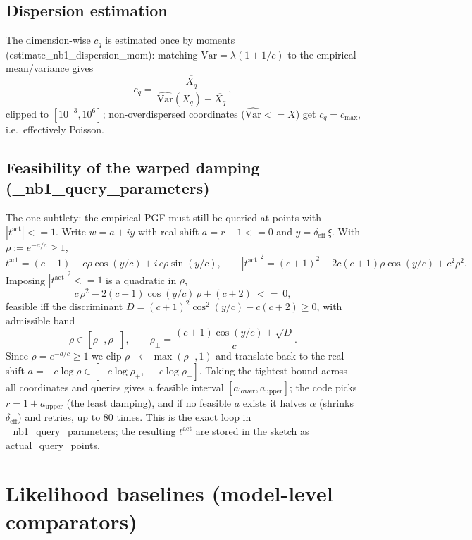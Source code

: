 \documentclass[11pt]{article}
\newcommand{\bt}{\bm{t}}
\newcommand{\deff}{\delta_{\mathrm{eff}}}
\newcommand{\code}[1]{\texttt{\small #1}}
\def\code#1{#1}%
\def\small{}%
\def\bm#1{#1}%
\def\bt{t}%
\def\le{<=}%
\theoremstyle{definition}
\begin{document}
\subsection{Dispersion estimation}
The dimension-wise $c_q$ is estimated once by moments (\code{estimate\_nb1\_dispersion\_mom}):
matching $\mathrm{Var}=\lambda(1+1/c)$ to the empirical mean/variance gives
\begin{equation}
c_q = \frac{\overline{X_q}}{\,\widehat{\mathrm{Var}}(X_q)-\overline{X_q}\,},
\end{equation}
clipped to $[10^{-3},10^{6}]$; non-overdispersed coordinates ($\widehat{\mathrm{Var}}\le\overline X$)
get $c_q=c_{\max}$, i.e.\ effectively Poisson.

\subsection{Feasibility of the warped damping (\code{\_nb1\_query\_parameters})}
The one subtlety: the empirical PGF must still be queried at points with
$|\bt^{\mathrm{act}}|\le1$. Write $w=a+iy$ with real shift $a=r-1\le0$ and
$y=\deff\,\xi$. With $\rho:=e^{-a/c}\ge1$,
\[
t^{\mathrm{act}} = (c+1)-c\rho\cos(y/c) + i\,c\rho\sin(y/c),
\qquad
|t^{\mathrm{act}}|^2 = (c+1)^2 - 2c(c+1)\rho\cos(y/c) + c^2\rho^2 .
\]
Imposing $|t^{\mathrm{act}}|^2\le1$ is a quadratic in $\rho$,
\begin{equation}
c\,\rho^2 - 2(c+1)\cos(y/c)\,\rho + (c+2)\ \le\ 0,
\end{equation}
feasible iff the discriminant $D=(c+1)^2\cos^2(y/c)-c(c+2)\ge0$, with admissible band
\begin{equation}
\rho\in[\rho_-,\rho_+],\qquad
\rho_\pm=\frac{(c+1)\cos(y/c)\pm\sqrt{D}}{c}.
\end{equation}
Since $\rho=e^{-a/c}\ge1$ we clip $\rho_-\leftarrow\max(\rho_-,1)$ and translate back to the
real shift $a=-c\log\rho\in[-c\log\rho_+,\,-c\log\rho_-]$. Taking the tightest bound across all
coordinates and queries gives a feasible interval $[a_{\mathrm{lower}},a_{\mathrm{upper}}]$;
the code picks $r=1+a_{\mathrm{upper}}$ (the least damping), and if no feasible $a$ exists it
halves $\alpha$ (shrinks $\deff$) and retries, up to $80$ times. This is the exact loop in
\code{\_nb1\_query\_parameters}; the resulting $\bt^{\mathrm{act}}$ are stored in the sketch as
\code{actual\_query\_points}.

\section{Likelihood baselines (model-level comparators)}
\end{document}
